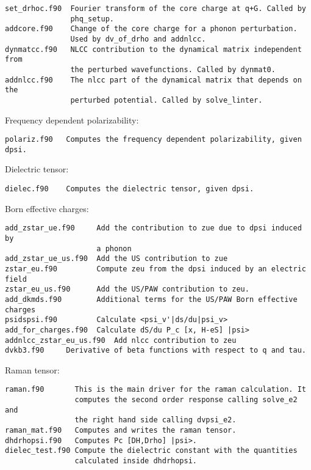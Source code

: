\documentclass[12pt,a4paper]{article}
\begin{document}
\begin{verbatim}
set_drhoc.f90  Fourier transform of the core charge at q+G. Called by
               phq_setup.
addcore.f90    Change of the core charge for a phonon perturbation.            
               Used by dv_of_drho and addnlcc.
dynmatcc.f90   NLCC contribution to the dynamical matrix independent from 
               the perturbed wavefunctions. Called by dynmat0.
addnlcc.f90    The nlcc part of the dynamical matrix that depends on the
               perturbed potential. Called by solve_linter.
\end{verbatim}

Frequency dependent polarizability:

\begin{verbatim}
polariz.f90   Computes the frequency dependent polarizability, given dpsi.
\end{verbatim}

Dielectric tensor:

\begin{verbatim}
dielec.f90    Computes the dielectric tensor, given dpsi.          
\end{verbatim}

Born effective charges:

\begin{verbatim}
add_zstar_ue.f90     Add the contribution to zue due to dpsi induced by 
                     a phonon      
add_zstar_ue_us.f90  Add the US contribution to zue             
zstar_eu.f90         Compute zeu from the dpsi induced by an electric field 
zstar_eu_us.f90      Add the US/PAW contribution to zeu.
add_dkmds.f90        Additional terms for the US/PAW Born effective charges    
psidspsi.f90         Calculate <psi_v'|ds/du|psi_v>
add_for_charges.f90  Calculate dS/du P_c [x, H-eS] |psi>            
addnlcc_zstar_eu_us.f90  Add nlcc contribution to zeu         
dvkb3.f90     Derivative of beta functions with respect to q and tau.  
\end{verbatim}

Raman tensor:

\begin{verbatim}
raman.f90       This is the main driver for the raman calculation. It 
                computes the second order response calling solve_e2 and
                the right hand side calling dvpsi_e2.
raman_mat.f90   Computes and writes the raman tensor.
dhdrhopsi.f90   Computes Pc [DH,Drho] |psi>.            
dielec_test.f90 Compute the dielectric constant with the quantities 
                calculated inside dhdrhopsi. 
\end{verbatim}
\end{document}
